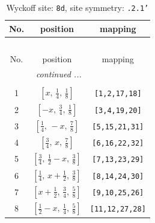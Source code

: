 \documentclass[fleqn,8pt]{jsarticle}
\begin{document}
\begin{longtable}{ccc}
\caption{Wyckoff site: {\tt 8d}, site symmetry: {\tt .2.1'}}
 \\
 \hline \hline
No. & position & mapping \\ \hline \endfirsthead

\multicolumn{2}{l}{\tablename\ \thetable{}} \\
 \hline \hline
No. & position & mapping \\ \hline \endhead

 \hline \hline
\multicolumn{2}{r}{\footnotesize\it continued ...} \\ \endfoot

 \hline \hline
\multicolumn{2}{r}{} \\ \endlastfoot

1 & $\left[ x,\, \frac{1}{4},\, \frac{1}{8} \right]$ & {\tt [1,2,17,18]} \\ \hline
2 & $\left[ - x,\, \frac{3}{4},\, \frac{1}{8} \right]$ & {\tt [3,4,19,20]} \\ \hline
3 & $\left[ \frac{1}{4},\, - x,\, \frac{7}{8} \right]$ & {\tt [5,15,21,31]} \\ \hline
4 & $\left[ \frac{3}{4},\, x,\, \frac{7}{8} \right]$ & {\tt [6,16,22,32]} \\ \hline
5 & $\left[ \frac{3}{4},\, \frac{1}{2} - x,\, \frac{3}{8} \right]$ & {\tt [7,13,23,29]} \\ \hline
6 & $\left[ \frac{1}{4},\, x + \frac{1}{2},\, \frac{3}{8} \right]$ & {\tt [8,14,24,30]} \\ \hline
7 & $\left[ x + \frac{1}{2},\, \frac{3}{4},\, \frac{5}{8} \right]$ & {\tt [9,10,25,26]} \\ \hline
8 & $\left[ \frac{1}{2} - x,\, \frac{1}{4},\, \frac{5}{8} \right]$ & {\tt [11,12,27,28]} \\
\end{longtable}
\renewcommand{\arraystretch}{1.2}
\end{document}
